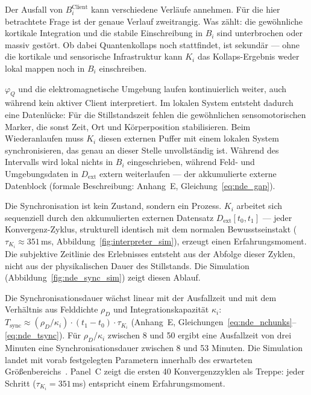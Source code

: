 \documentclass[11pt,a4paper]{article}
\begin{document}
Der Ausfall von $B_i^{\mathrm{Client}}$ kann verschiedene Verläufe annehmen.
Für die hier betrachtete Frage ist der genaue Verlauf zweitrangig.
Was zählt: die gewöhnliche kortikale Integration und die stabile
Einschreibung in $B_i$ sind unterbrochen oder massiv gestört.
Ob dabei Quantenkollaps noch stattfindet, ist sekundär — ohne die kortikale
und sensorische Infrastruktur kann $K_i$ das Kollaps-Ergebnis weder lokal
mappen noch in $B_i$ einschreiben.

$\varphi_Q$ und die elektromagnetische Umgebung laufen kontinuierlich weiter,
auch während kein aktiver Client interpretiert. Im lokalen System entsteht
dadurch eine Datenlücke: Für die Stillstandszeit fehlen die gewöhnlichen
sensomotorischen Marker, die sonst Zeit, Ort und Körperposition stabilisieren.
Beim Wiederanlaufen muss $K_i$ diesen externen Puffer mit einem lokalen
System synchronisieren, das genau an dieser Stelle unvollständig ist.
Während des Intervalls wird lokal nichts in $B_i$ eingeschrieben, während
Feld- und Umgebungsdaten in $D_{\mathrm{ext}}$ extern weiterlaufen —
der akkumulierte externe Datenblock (formale Beschreibung: Anhang~E,
Gleichung~\eqref{eq:nde_gap}).

Die Synchronisation ist kein Zustand, sondern ein Prozess. $K_i$ arbeitet
sich sequenziell durch den akkumulierten externen Datensatz
$D_{\mathrm{ext}}[t_0, t_1]$ — jeder Konvergenz-Zyklus, strukturell
identisch mit dem normalen Bewusstseinstakt
($\tau_{K_i} \approx 351\,$ms, Abbildung~\ref{fig:interpreter_sim}),
erzeugt einen Erfahrungsmoment. Die subjektive Zeitlinie des Erlebnisses
entsteht aus der Abfolge dieser Zyklen, nicht aus der physikalischen Dauer
des Stillstands. Die Simulation (Abbildung~\ref{fig:nde_sync_sim}) zeigt diesen Ablauf.

Die Synchronisationsdauer wächst linear mit der Ausfallzeit und mit dem
Verhältnis aus Felddichte $\rho_D$ und Integrationskapazität $\kappa_i$:
$T_{\mathrm{sync}} \approx (\rho_D/\kappa_i) \cdot (t_1-t_0) \cdot \tau_{K_i}$
(Anhang~E, Gleichungen~\eqref{eq:nde_nchunks}–\eqref{eq:nde_tsync}).
Für $\rho_D/\kappa_i$ zwischen 8 und 50 ergibt eine Ausfallzeit von drei
Minuten eine Synchronisationsdauer zwischen 8 und 53 Minuten. Die Simulation
landet mit vorab festgelegten Parametern innerhalb des erwarteten
Größenbereichs~\citep{vanlommel2001}. Panel~C zeigt die ersten 40 Konvergenzzyklen
als Treppe: jeder Schritt ($\tau_{K_i} = 351\,$ms) entspricht einem Erfahrungsmoment.
\end{document}
